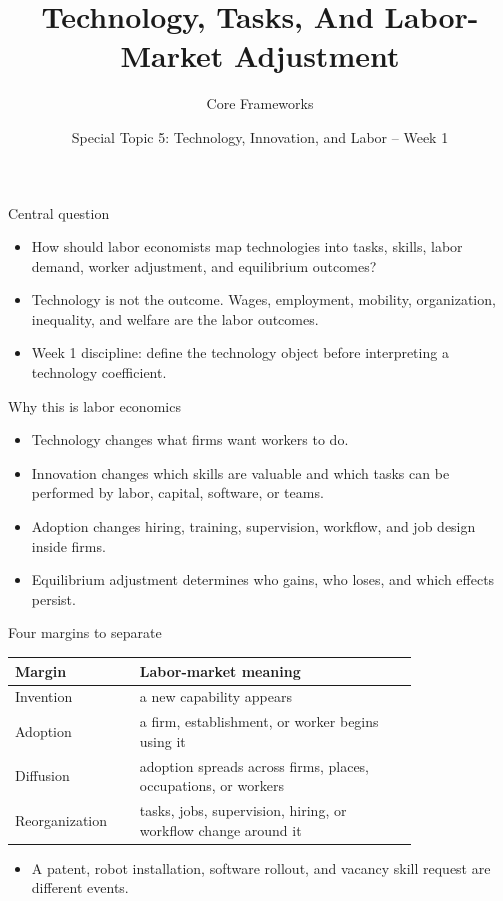 \documentclass[aspectratio=169,11pt]{beamer}
\title{Technology, Tasks, And Labor-Market Adjustment}
\subtitle{Core Frameworks}
\author{Special Topic 5: Technology, Innovation, and Labor -- Week 1}
\date{}
\begin{document}
\begin{frame}
  \titlepage
\end{frame}

\begin{frame}{Central question}
\begin{itemize}
    \item How should labor economists map technologies into tasks, skills, labor demand, worker adjustment, and equilibrium outcomes?
    \item Technology is not the outcome. Wages, employment, mobility, organization, inequality, and welfare are the labor outcomes.
    \item Week 1 discipline: define the technology object before interpreting a technology coefficient.
\end{itemize}
\end{frame}

\begin{frame}{Why this is labor economics}
\begin{itemize}
    \item Technology changes what firms want workers to do.
    \item Innovation changes which skills are valuable and which tasks can be performed by labor, capital, software, or teams.
    \item Adoption changes hiring, training, supervision, workflow, and job design inside firms.
    \item Equilibrium adjustment determines who gains, who loses, and which effects persist.
\end{itemize}
\end{frame}

\begin{frame}{Four margins to separate}
\small
\begin{tabular}{p{0.22\linewidth} p{0.58\linewidth}}
\toprule
Margin & Labor-market meaning \\
\midrule
Invention & a new capability appears \\
Adoption & a firm, establishment, or worker begins using it \\
Diffusion & adoption spreads across firms, places, occupations, or workers \\
Reorganization & tasks, jobs, supervision, hiring, or workflow change around it \\
\bottomrule
\end{tabular}
\vspace{0.35cm}
\begin{itemize}
    \item A patent, robot installation, software rollout, and vacancy skill request are different events.
\end{itemize}
\end{frame}
\end{document}
